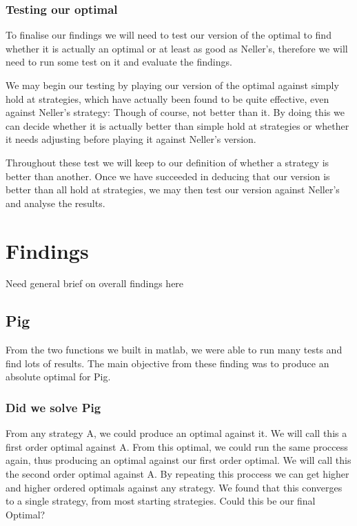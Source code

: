 \documentclass[a4paper,titlepage]{article}
\begin{document}
\subsubsection{Testing our optimal}
To finalise our findings we will need to test our version of the optimal to find whether it is actually an optimal or at least as good as Neller’s\citep{neller2004optimal}, therefore we will need to run some test on it and evaluate the findings.

We may begin our testing by playing our version of the optimal against simply hold at strategies, which have actually been found to be quite effective, even against Neller’s strategy:  Though of course, not better than it. By doing this we can decide whether it is actually better than simple hold at strategies or whether it needs adjusting before playing it against Neller’s version.

Throughout these test we will keep to our definition of whether a strategy is better than another. Once we have succeeded in deducing that our version is better than all hold at strategies, we may then test our version against Neller’s and analyse the results.

\section{Findings}

Need general brief on overall findings here

\subsection{Pig}

From the two functions we built in matlab, we were able to run many tests and find lots of results. The main objective from these finding was to produce an absolute optimal for Pig.

\subsubsection{Did we solve Pig}

From any strategy A, we could produce an optimal against it. We will call this a first order optimal against A. From this optimal, we could run the same proccess again, thus producing an optimal against our first order optimal. We will call this the second order optimal against A. By repeating this proccess we can get higher and higher ordered optimals against any strategy. We found that this converges to a single strategy, from most starting strategies. Could this be our final Optimal?
\end{document}
